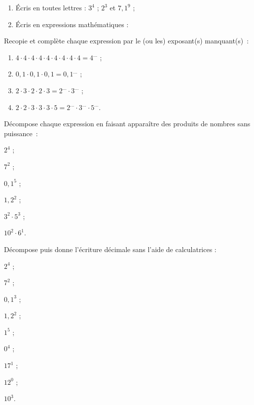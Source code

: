 \begin{exercice}
\begin{enumerate}
 \item Écris en toutes lettres : $3^4$ ; $2^3$ et $7,1^9$ ;
 \item Écris en expressions mathématiques :
 \end{enumerate}
\end{exercice}

\begin{exercice}
Recopie et complète chaque expression par le (ou les) exposant(s) manquant(s) :
\begin{enumerate}
 \item $4 \cdot 4 \cdot 4 \cdot 4 \cdot 4 \cdot 4 \cdot 4 \cdot 4 \cdot 4 = 4^{...}$ ;
 \item $0,1 \cdot 0,1 \cdot 0,1 = 0,1^{...}$ ;
 \item $2 \cdot 3 \cdot 2 \cdot 2 \cdot 3 = 2^{...} \cdot 3^{...}$ ;
 \item $2 \cdot 2 \cdot 3 \cdot 3 \cdot 3 \cdot 5 = 2^{...} \cdot 3^{...} \cdot 5^{...}$.
 \end{enumerate}
\end{exercice}

\begin{exercice}[Décomposition]
Décompose chaque expression en faisant apparaître des produits de nombres sans puissance :
\begin{colenumerate}{3}
 \item $2^4$ ;
 \item $7^2$ ;
 \item $0,1^5$ ;
 \item $1,2^2$ ;
 \item $3^2 \cdot 5^3$ ;
 \item $10^2 \cdot 6^1$.
 \end{colenumerate}
\end{exercice}

\begin{exercice}
Décompose puis donne l'écriture décimale sans l’aide de calculatrices :
\begin{colenumerate}{3}
 \item $2^4$ ;
 \item $7^2$ ;
 \item $0,1^3$ ;
 \item $1,2^2$ ;
 \item $1^5$ ;
 \item $0^4$ ;
 \item $17^1$ ;
 \item $12^0$ ;
 \item $10^3$.
 \end{colenumerate}
\end{exercice}


